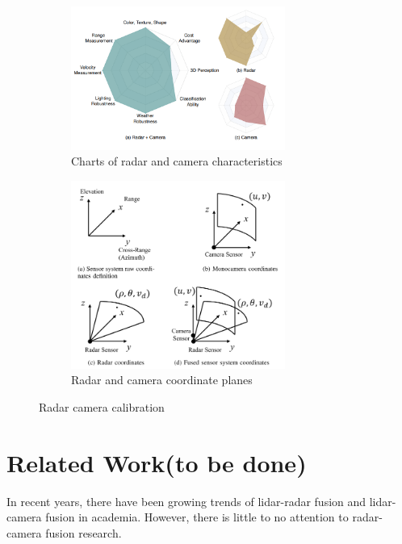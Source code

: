 \begin{figure}[hbpt]
    \centering
    \begin{subfigure}{0.3\linewidth}
        \includegraphics[width=7cm]{Figures/trade_off.png}
        \caption{Charts of radar and camera characteristics\cite{Yao_2023}}
        \label{subfig:trade_off_sub}
    \end{subfigure}
    \hspace{0.2\textwidth}
    \begin{subfigure}{0.3\linewidth}
        \includegraphics[width=7cm]{Figures/cam_radar_coordinates.png}
        \caption{Radar and camera coordinate planes\cite{8844649}}
        \label{subfig:cam_radar_sub}
    \end{subfigure}

    \caption{Radar camera calibration}
    \label{fig:trade_off_and_plane}
\end{figure}




\section{Related Work\small(to be done)}\label{sec:1-related_work}
In recent years, there have been growing trends of lidar-radar fusion and lidar-camera fusion in academia.
However, there is little to no attention to radar-camera fusion research. 


